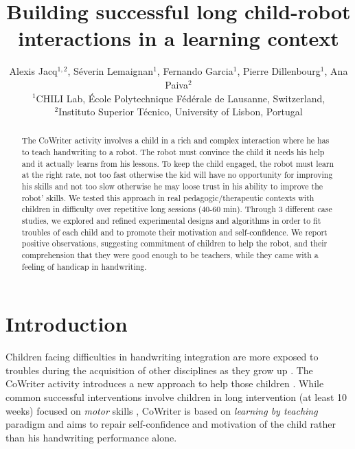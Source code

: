 \documentclass{sig-alternate}
\begin{document}
\title{Building successful long child-robot interactions in a learning context}

\author{Alexis Jacq$^{1,2}$, S\'everin Lemaignan$^1$, Fernando Garcia$^1$, Pierre Dillenbourg$^1$, Ana Paiva$^2$\\
$^1$CHILI Lab, \'Ecole Polytechnique F\'ed\'erale de Lausanne, Switzerland,\\
$^2$Instituto Superior T\'{e}cnico, University of Lisbon, Portugal}




\maketitle
\begin{abstract}

The CoWriter activity involves a child in a rich and complex interaction where he has to
teach handwriting to a robot. The robot must convince the child it needs his help and it
actually learns from his lessons. To keep the child engaged, 
the robot must learn at the right rate, not too fast otherwise the kid will have
no opportunity for improving his skills and not too slow otherwise he may loose
trust in his ability to improve the robot' skills.
We tested this approach in real pedagogic/therapeutic contexts with
children in difficulty over repetitive long sessions (40-60 min). Through 3 different
case studies, we explored and refined experimental designs and algorithms in order to fit
troubles of each child and to promote their motivation and self-confidence. We report positive observations, suggesting commitment of children to help the
robot, and their comprehension that they were good enough to be teachers, while they came with
a feeling of handicap in handwriting. 

\end{abstract}


\section{Introduction}

Children facing difficulties in handwriting integration are more exposed
to troubles during the acquisition of other disciplines as they grow up
\cite{Christensen2005}. 
The CoWriter activity introduces a new approach to help those children
\cite{Hood}. While common successful interventions involve children
in long intervention (at least 10 weeks) focused on \emph{motor} skills \cite{Hoy2011},
CoWriter is based on \emph{learning by teaching} paradigm and aims to repair
self-confidence and motivation of the child rather than his handwriting performance alone.
\end{document}
